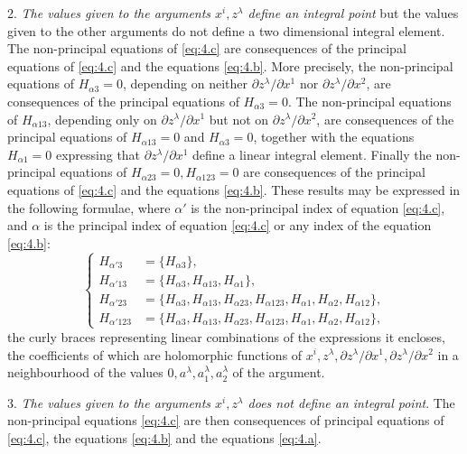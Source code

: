 \documentclass[leqno,11pt]{book}
\numberwithin{equation}{chapter}
\newcommand{\pd}{\partial}
\theoremstyle{shape1}
\theoremstyle{shape0}
\theoremstyle{shape2}
\theoremstyle{definition}
\begin{document}
2. \emph{The values given to the arguments $x^{i}, z^{\lambda}$ define an integral point} but the values given to the other arguments do not define a two dimensional integral element. The non-principal equations of \eqref{eq:4.c} are  consequences of the principal equations of \eqref{eq:4.c} and the equations \eqref{eq:4.b}. More precisely, the non-principal equations of $H_{\alpha 3}=0$, depending on neither $\pd z^\lambda/\pd x^{1}$ nor $\pd z^{\lambda}/\pd x^{2}$, are consequences of the principal equations of $H_{\alpha 3}=0$. The non-principal equations of $H_{\alpha 13}$, depending only on $\pd z^\lambda/\pd x^{1}$ but not on $\pd z^{\lambda}/\pd x^{2}$, are consequences of the principal equations of $H_{\alpha 13}=0$ and $H_{\alpha 3}=0$, together with the equations $H_{\alpha 1}=0$  expressing that $\pd z^{\lambda}/\pd x^{1}$ define a linear integral element. Finally the non-principal equations of $H_{\alpha 23}=0, H_{\alpha 123}=0$ are consequences of the principal equations of \eqref{eq:4.c} and the equations \eqref{eq:4.b}. These results may be expressed in the following formulae, where $\alpha'$ is the non-principal index of equation \eqref{eq:4.c}, and $\alpha$ is the principal index of equation \eqref{eq:4.c} or any index of the equation \eqref{eq:4.b}:
\begin{equation}
  \label{eq:4.9}
  \left\{
    \begin{aligned}
      H_{\alpha'3}&=\{H_{\alpha 3}\},\\
      H_{\alpha'13}&=\{H_{\alpha 3}, H_{\alpha 13}, H_{\alpha 1}\},\\
      H_{\alpha'23}&=\{H_{\alpha 3}, H_{\alpha 13}, H_{\alpha 23}, H_{\alpha 123}, H_{\alpha 1}, H_{\alpha 2}, H_{\alpha 12}\},\\
      H_{\alpha'123}&=\{H_{\alpha 3}, H_{\alpha 13}, H_{\alpha 23}, H_{\alpha 123}, H_{\alpha 1}, H_{\alpha 2}, H_{\alpha 12}\},
    \end{aligned}
  \right.
\end{equation}
the curly braces representing linear combinations of the expressions it encloses, the coefficients of which are holomorphic functions of $x^{i}, z^{\lambda}, \pd z^{\lambda}/\pd x^{1}, \pd z^{\lambda}/\pd x^{2}$ in a neighbourhood of the values $0, a^{\lambda}, a^{\lambda}_{1}, a^{\lambda}_{2}$ of the argument.
\vspace{12pt}

3. \emph{The values given to the arguments $x^{i}, z^{\lambda}$ does not define an integral point}. The non-principal equations \eqref{eq:4.c} are then consequences of principal equations of \eqref{eq:4.c}, the equations \eqref{eq:4.b} and the equations \eqref{eq:4.a}.
\vspace{12pt}
\end{document}
